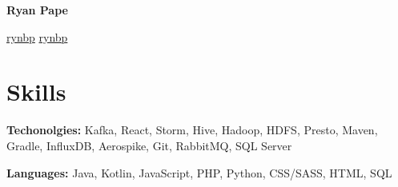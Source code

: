 \documentclass[letterpaper,11pt]{article}
\newcommand{\contactspace}{\hspace{9pt}}
\begin{document}
\centerline{\huge \textbf{Ryan Pape}}
\vspace{3pt}
\centerline{\href{https://linkedin.com/in/rynbp}{\faLinkedin \space rynbp} \contactspace \href{https://github.com/rynbp}{\faGithub \space rynbp}}

\section{Skills}
  \begin{minipage}[t]{0.6\linewidth}
    {\bfseries Techonolgies:} Kafka, React, Storm, Hive, Hadoop, HDFS, Presto, Maven, Gradle, InfluxDB, Aerospike, Git, RabbitMQ, SQL Server
  \end{minipage}
  \hspace{0.04\linewidth}
  \begin{minipage}[t]{0.35\linewidth}
    {\bfseries Languages:} Java, Kotlin, JavaScript, PHP, Python, CSS/SASS, HTML, SQL
  \end{minipage}

\end{document}
